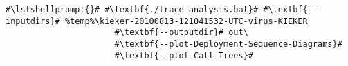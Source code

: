 \begin{lstlisting}[caption=Commands to produce the diagrams under Windows,label=lst:traceAnalysis:sequenceDiagramWin]
#\lstshellprompt{}# #\textbf{./trace-analysis.bat}# #\textbf{--inputdirs}# %temp%\kieker-20100813-121041532-UTC-virus-KIEKER
                      #\textbf{--outputdir}# out\
                      #\textbf{--plot-Deployment-Sequence-Diagrams}#
                      #\textbf{--plot-Call-Trees}#		
\end{lstlisting}
